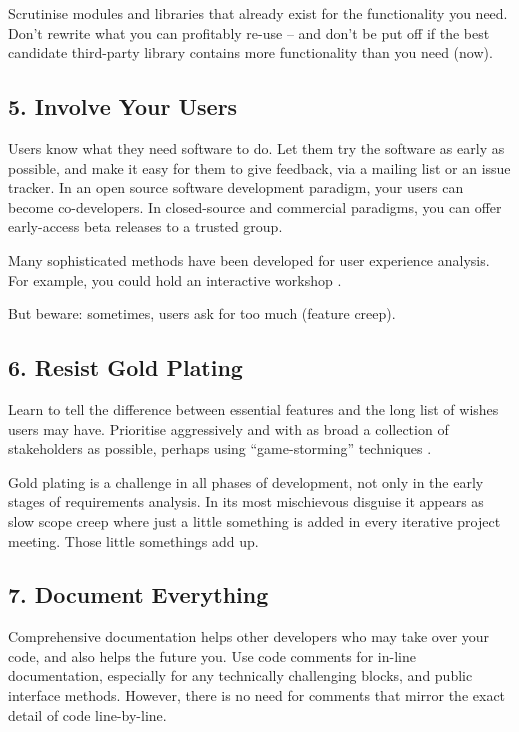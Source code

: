 \documentclass{bmcart}
\begin{document}
Scrutinise modules and libraries that already exist for the functionality you need. Don't rewrite what you can profitably re-use -- and don't be put off if the best candidate third-party library contains more functionality than you need (now).  

\subsection*{5. Involve Your Users}

Users know what they need software to do. Let them try the software as early as possible, and make it easy for them to give feedback, via a mailing list or an issue tracker. In an open source software development paradigm, your users can become co-developers. In closed-source and commercial paradigms, you can offer early-access beta releases to a trusted group.  

Many sophisticated methods have been developed for user experience analysis. For example, you could hold an interactive workshop \cite{pavelin2014}. 

But beware: sometimes, users ask for too much (feature creep). 

\subsection*{6. Resist Gold Plating}

Learn to tell the difference between essential features and the long list of wishes users may have. Prioritise aggressively and with as broad a collection of stakeholders as possible, perhaps using ``game-storming'' techniques \cite{gamestorm}.   

Gold plating is a challenge in all phases of development, not only in the early stages of requirements analysis. In its most mischievous disguise it appears as slow scope creep where just a little something is added in every iterative project meeting. Those little somethings add up. 

\subsection*{7. Document Everything}

Comprehensive documentation helps other developers who may take over your code, and also helps the future you. Use code comments for in-line documentation, especially for any technically challenging blocks, and public interface methods. However, there is no need for comments that mirror the exact detail of code line-by-line. 
\end{document}
